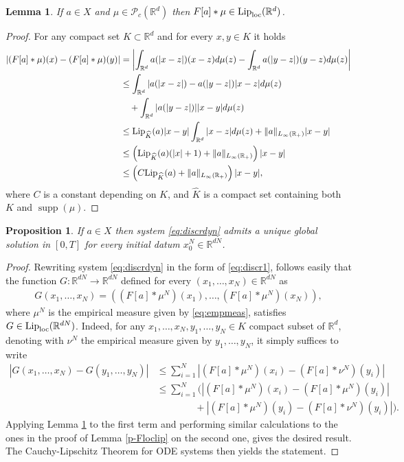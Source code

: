 \documentclass[A4paper,11pt]{article}
\newtheorem{lemma}[theorem]{Lemma}
\newtheorem{proposition}[theorem]{Proposition}
\theoremstyle{definition}
\newcommand{\Lip}{\textup{Lip}}
\newcommand{\loc}{\textup{loc}}
\newcommand{\R}{\mathbb{R}}
\DeclareMathOperator{\supp}{supp}
\begin{document}
\begin{lemma}\label{p-Fmuloclip}
If $a\in X$ and $\mu \in \mathcal{P}_c(\R^d)$ then $F[a]*\mu \in \Lip_{\loc}(\R^d)$.
\end{lemma}
\begin{proof}
For any compact set $K \subset \R^d$ and for every $x,y \in K$ it holds
\begin{align*}
|(F[a]*\mu)(x) - (F[a]*\mu)(y)| &= \left|\int_{\R^d}a(|x-z|)(x-z)d\mu(z) - \int_{\R^d}a(|y-z|)(y-z)d\mu(z)\right| \\
&\leq \int_{\R^d}|a(|x-z|)-a(|y-z|)|x-z|d\mu(z)\\
&\quad+ \int_{\R^d}|a(|y-z|)||x-y|d\mu(z) \\
&\leq \Lip_{\widehat{K}}(a)|x-y| \int_{\R^d}|x-z|d\mu(z) + \|a\|_{L_{\infty}(\R_+)}|x-y| \\
&\leq \left(\Lip_{\widehat{K}}(a)(|x| + 1)+ \|a\|_{L_{\infty}(\R_+)}\right)|x-y| \\
& \leq \left(C\Lip_{\widehat{K}}(a) + \|a\|_{L_{\infty}(\R_+)} \right)|x-y|,
\end{align*}
where $C$ is a constant depending on $K$, and $\widehat{K}$ is a compact set containing both $K$ and $\supp(\mu)$.
\end{proof}



\begin{proposition}
If $a \in X$ then system \eqref{eq:discrdyn} admits a unique global solution in $[0,T]$ for every initial datum $x^{N}_0 \in \R^{dN}$.
\end{proposition}
\begin{proof}
Rewriting system \eqref{eq:discrdyn} in the form of \eqref{eq:discr1}, follows easily that the function $G:\R^{dN} \rightarrow \R^{dN}$ defined for every $(x_1, \ldots, x_N)\in \R^{dN}$ as
\begin{align*}
G(x_1, \ldots, x_N) = ((F[a]*\mu^N)(x_1),\ldots,(F[a]*\mu^N)(x_N)),
\end{align*}
where $\mu^N$ is the empirical measure given by \eqref{eq:empmeas}, satisfies $G \in \Lip_\loc(\R^{dN})$. Indeed, for any $x_1, \ldots, x_N, y_1, \ldots, y_N \in K$ compact subset of $\R^d$, denoting with $\nu^N$ the empirical measure given by $y_1, \ldots, y_N$, it simply suffices to write
\begin{align*}
|G(x_1, \ldots, x_N) - G(y_1,\ldots,y_N)| &\leq \sum^N_{i = 1} |(F[a]*\mu^N)(x_i) - (F[a]*\nu^N)(y_i)| \\
&\leq \sum^N_{i = 1} \Bigg( |(F[a]*\mu^N)(x_i) - (F[a]*\mu^N)(y_i)| \\
&\quad \quad \quad \quad +|(F[a]*\mu^N)(y_i) - (F[a]*\nu^N)(y_i)| \Bigg).
\end{align*}
Applying Lemma \ref{p-Fmuloclip} to the first term and performing similar calculations to the ones in the proof of Lemma \ref{p-Floclip} on the second one, gives the desired result. The Cauchy-Lipschitz Theorem for ODE systems then yields the statement.
\end{proof}
\end{document}
